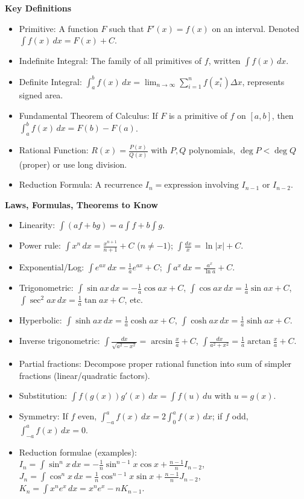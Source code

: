 \documentclass[11pt]{article}
\newcommand{\cle}[1]{{\popxbold\color{popdark}#1}}
\begin{document}
\begin{bilan}
\textbf{Key Definitions}
\begin{itemize}
\item \cle{Primitive}: A function $F$ such that $F'(x)=f(x)$ on an interval. Denoted $\int f(x)\,dx = F(x)+C$.
\item \cle{Indefinite Integral}: The family of all primitives of $f$, written $\int f(x)\,dx$.
\item \cle{Definite Integral}: $\int_a^b f(x)\,dx = \lim_{n\to\infty}\sum_{i=1}^n f(x_i^*)\Delta x$, represents signed area.
\item \cle{Fundamental Theorem of Calculus}: If $F$ is a primitive of $f$ on $[a,b]$, then $\int_a^b f(x)\,dx = F(b)-F(a)$.
\item \cle{Rational Function}: $R(x)=\frac{P(x)}{Q(x)}$ with $P,Q$ polynomials, $\deg P < \deg Q$ (proper) or use long division.
\item \cle{Reduction Formula}: A recurrence $I_n = \text{expression involving } I_{n-1}$ or $I_{n-2}$.
\end{itemize}

\textbf{Laws, Formulas, Theorems to Know}
\begin{itemize}
\item Linearity: $\int (af+bg)=a\int f+b\int g$.
\item Power rule: $\int x^n\,dx = \frac{x^{n+1}}{n+1}+C$ ($n\neq -1$); $\int \frac{dx}{x}=\ln|x|+C$.
\item Exponential/Log: $\int e^{ax}\,dx=\frac{1}{a}e^{ax}+C$; $\int a^x\,dx=\frac{a^x}{\ln a}+C$.
\item Trigonometric: $\int \sin ax\,dx=-\frac{1}{a}\cos ax+C$, $\int \cos ax\,dx=\frac{1}{a}\sin ax+C$, $\int \sec^2 ax\,dx=\frac{1}{a}\tan ax+C$, etc.
\item Hyperbolic: $\int \sinh ax\,dx=\frac{1}{a}\cosh ax+C$, $\int \cosh ax\,dx=\frac{1}{a}\sinh ax+C$.
\item Inverse trigonometric: $\int \frac{dx}{\sqrt{a^2-x^2}}=\arcsin\frac{x}{a}+C$, $\int \frac{dx}{a^2+x^2}=\frac{1}{a}\arctan\frac{x}{a}+C$.
\item Partial fractions: Decompose proper rational function into sum of simpler fractions (linear/quadratic factors).
\item Substitution: $\int f(g(x))g'(x)\,dx = \int f(u)\,du$ with $u=g(x)$.
\item Symmetry: If $f$ even, $\int_{-a}^a f(x)\,dx = 2\int_0^a f(x)\,dx$; if $f$ odd, $\int_{-a}^a f(x)\,dx = 0$.
\item Reduction formulae (examples): 
$I_n=\int \sin^n x\,dx = -\frac{1}{n}\sin^{n-1}x\cos x + \frac{n-1}{n}I_{n-2}$,
$J_n=\int \cos^n x\,dx = \frac{1}{n}\cos^{n-1}x\sin x + \frac{n-1}{n}J_{n-2}$,
$K_n=\int x^n e^x\,dx = x^n e^x - n K_{n-1}$.
\end{itemize}


\end{bilan}
\end{document}
